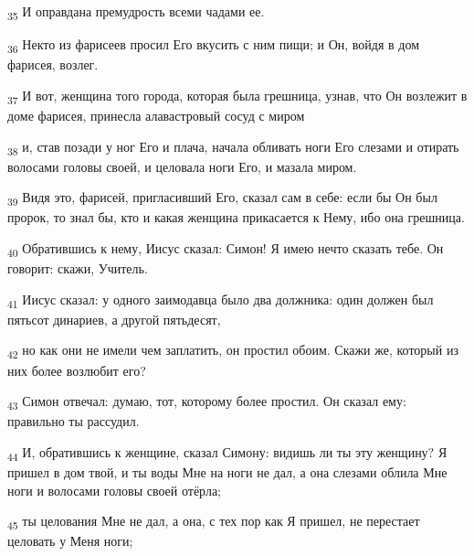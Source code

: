 \begin{tcolorbox}
\textsubscript{35} И оправдана премудрость всеми чадами ее.
\end{tcolorbox}
\begin{tcolorbox}
\textsubscript{36} Некто из фарисеев просил Его вкусить с ним пищи; и Он, войдя в дом фарисея, возлег.
\end{tcolorbox}
\begin{tcolorbox}
\textsubscript{37} И вот, женщина того города, которая была грешница, узнав, что Он возлежит в доме фарисея, принесла алавастровый сосуд с миром
\end{tcolorbox}
\begin{tcolorbox}
\textsubscript{38} и, став позади у ног Его и плача, начала обливать ноги Его слезами и отирать волосами головы своей, и целовала ноги Его, и мазала миром.
\end{tcolorbox}
\begin{tcolorbox}
\textsubscript{39} Видя это, фарисей, пригласивший Его, сказал сам в себе: если бы Он был пророк, то знал бы, кто и какая женщина прикасается к Нему, ибо она грешница.
\end{tcolorbox}
\begin{tcolorbox}
\textsubscript{40} Обратившись к нему, Иисус сказал: Симон! Я имею нечто сказать тебе. Он говорит: скажи, Учитель.
\end{tcolorbox}
\begin{tcolorbox}
\textsubscript{41} Иисус сказал: у одного заимодавца было два должника: один должен был пятьсот динариев, а другой пятьдесят,
\end{tcolorbox}
\begin{tcolorbox}
\textsubscript{42} но как они не имели чем заплатить, он простил обоим. Скажи же, который из них более возлюбит его?
\end{tcolorbox}
\begin{tcolorbox}
\textsubscript{43} Симон отвечал: думаю, тот, которому более простил. Он сказал ему: правильно ты рассудил.
\end{tcolorbox}
\begin{tcolorbox}
\textsubscript{44} И, обратившись к женщине, сказал Симону: видишь ли ты эту женщину? Я пришел в дом твой, и ты воды Мне на ноги не дал, а она слезами облила Мне ноги и волосами головы своей отёрла;
\end{tcolorbox}
\begin{tcolorbox}
\textsubscript{45} ты целования Мне не дал, а она, с тех пор как Я пришел, не перестает целовать у Меня ноги;
\end{tcolorbox}
